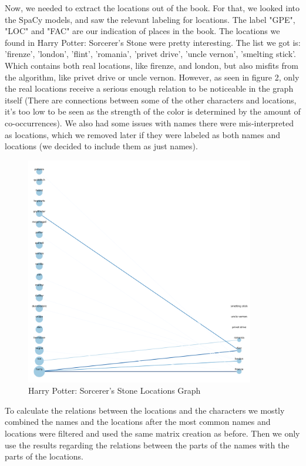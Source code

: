 \documentclass{article}
\begin{document}
Now, we needed to extract the locations out of the book. For that, we looked into the SpaCy models, and saw the relevant labeling for locations. The label "GPE", "LOC" and "FAC" are our indication of places in the book. The locations we found in Harry Potter: Sorcerer's Stone were pretty interesting. The list we got is: 'firenze', 'london', 'flint', 'romania', 'privet drive', 'uncle vernon', 'smelting stick'. Which contains both real locations, like firenze, and london, but also misfits from the algorithm, like privet drive or uncle vernon. However, as seen in figure 2, only the real locations receive a serious enough relation to be noticeable in the graph itself (There are connections between some of the other characters and locations, it's too low to be seen as the strength of the color is determined by the amount of co-occurrences). We also had some issues with names there were mis-interpreted as locations, which we removed later if they were labeled as both names and locations (we decided to include them as just names).
\begin{figure}[h]
  \centering
  \includegraphics[width=10cm]{Harry Potter 1 - Sorcerer's Stone locations graph.png}
  \caption{Harry Potter: Sorcerer's Stone Locations Graph}
  \label{fig2}
\end{figure}

To calculate the relations between the locations and the characters we mostly combined the names and the locations after the most common names and locations were filtered and used the same matrix creation as before. Then we only use the results regarding the relations between the parts of the names with the parts of the locations.
\end{document}
